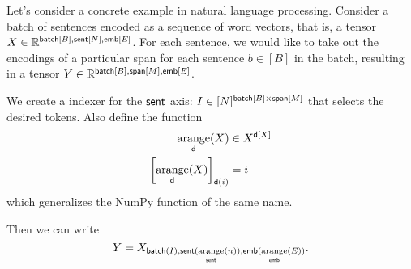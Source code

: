 Let's consider a concrete example in natural language processing. Consider a batch of sentences encoded as a sequence of word vectors, that is, a tensor $X \in \mathbb{R}^{\nset{batch}{B}, \nset{sent}{N}, \nset{emb}{E}}$. For each sentence, we would like to take out the encodings of a particular span for each sentence $b \in [B]$ in the batch, resulting in a tensor $Y \in \mathbb{R}^{\nset{batch}{B}, \nset{span}{M}, \nset{emb}{E}}$.

We create a indexer for the $\name{sent}$ axis: $I \in [N]^{\nset{batch}{B} \times \nset{span}{M}}$ that selects the desired tokens. Also define the function
\begin{align*}
  \nfun{d}{arange}(X) &\in X^{\nset{d}{X}} \\
  \left[\nfun{d}{arange}(X)\right]_{\nidx{d}{i}} &= i
\end{align*}
which generalizes the NumPy function of the same name.

Then we can write
\begin{equation*}
  Y = X_{\nidx{batch}{I}, \nidx{sent}{\nfun{sent}{arange}(n)}, \nidx{emb}{\nfun{emb}{arange}(E)}}.
\end{equation*}
